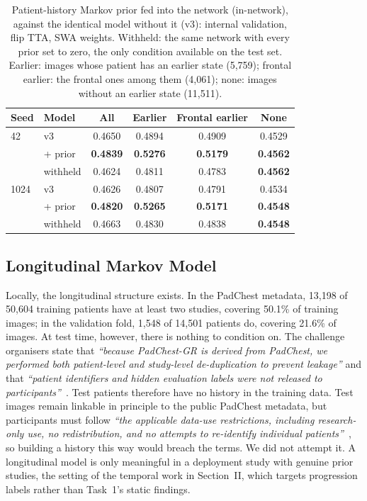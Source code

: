 \documentclass[conference]{IEEEtran}
\begin{document}
\begin{table}[htbp]
\caption{Patient-history Markov prior fed into the network (in-network), against the identical model without it (v3): internal validation, flip TTA, SWA weights. Withheld: the same network with every prior set to zero, the only condition available on the test set. Earlier: images whose patient has an earlier state (5,759); frontal earlier: the frontal ones among them (4,061); none: images without an earlier state (11,511).}
\begin{center}
\footnotesize
\setlength{\tabcolsep}{4pt}
\begin{tabular}{|l|l|c|c|c|c|}
\hline
\textbf{Seed} & \textbf{Model} & \textbf{All} & \textbf{Earlier} & \textbf{Frontal earlier} & \textbf{None} \\
\hline
42 & v3 & 0.4650 & 0.4894 & 0.4909 & 0.4529 \\
 & + prior & \textbf{0.4839} & \textbf{0.5276} & \textbf{0.5179} & \textbf{0.4562} \\
 & withheld & 0.4624 & 0.4811 & 0.4783 & \textbf{0.4562} \\
\hline
1024 & v3 & 0.4626 & 0.4807 & 0.4791 & 0.4534 \\
 & + prior & \textbf{0.4820} & \textbf{0.5265} & \textbf{0.5171} & \textbf{0.4548} \\
 & withheld & 0.4663 & 0.4830 & 0.4838 & \textbf{0.4548} \\
\hline
\end{tabular}
\label{tab:phprior}
\end{center}
\end{table}

\subsection{Longitudinal Markov Model}
\label{sec:hmmres}
Locally, the longitudinal structure exists. In the PadChest metadata, 13,198 of 50,604 training patients have at least two studies, covering 50.1\% of training images; in the validation fold, 1,548 of 14,501 patients do, covering 21.6\% of images. At test time, however, there is nothing to condition on. The challenge organisers state that \emph{``because PadChest-GR is derived from PadChest, we performed both patient-level and study-level de-duplication to prevent leakage''} and that \emph{``patient identifiers and hidden evaluation labels were not released to participants''}~\cite{b14}. Test patients therefore have no history in the training data. Test images remain linkable in principle to the public PadChest metadata, but participants must follow \emph{``the applicable data-use restrictions, including research-only use, no redistribution, and no attempts to re-identify individual patients''}~\cite{b14}, so building a history this way would breach the terms. We did not attempt it. A longitudinal model is only meaningful in a deployment study with genuine prior studies, the setting of the temporal work in Section~II, which targets progression labels rather than Task~1's static findings.
\end{document}
